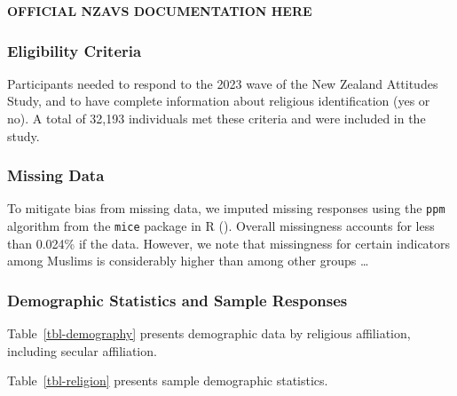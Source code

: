 \documentclass[
  single column]{article}
\begin{document}
\textbf{OFFICIAL NZAVS DOCUMENTATION HERE}

\subsubsection{Eligibility Criteria}\label{eligibility-criteria}

Participants needed to respond to the 2023 wave of the New Zealand
Attitudes Study, and to have complete information about religious
identification (yes or no). A total of 32,193 individuals met these
criteria and were included in the study.

\subsubsection{Missing Data}\label{missing-data}

To mitigate bias from missing data, we imputed missing responses using
the \texttt{ppm} algorithm from the \texttt{mice} package in R
(). Overall missingness
accounts for less than 0.024\% if the data. However, we note that
missingness for certain indicators among Muslims is considerably higher
than among other groups \ldots{}

\subsubsection{Demographic Statistics and Sample
Responses}\label{demographic-statistics-and-sample-responses}

Table~\ref{tbl-demography} presents demographic data by religious
affiliation, including secular affiliation.

Table~\ref{tbl-religion} presents sample demographic statistics.
\end{document}
